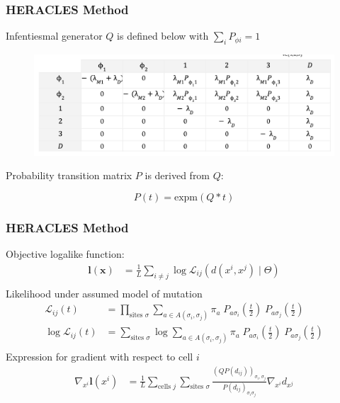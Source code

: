 \documentclass[
	11pt, %
]{beamer}
\begin{document}

\begin{frame}
	\frametitle{HERACLES Method}
	Infentiesmal generator $Q$ is defined below with $\sum_i P_{\phi i} = 1$

	\begin{figure}
		\includegraphics[width=0.95 \linewidth]{rate-matrix-q.png}
	\end{figure}

	Probability transition matrix $P$ is derived from $Q$:

	\begin{equation*}
		P(t) = \textrm{expm}(Q * t)
	\end{equation*}
\end{frame}


\begin{frame}
	\frametitle{HERACLES Method}
	Objective logalike function:
	\begin{align*}
		\mathbf{l}(\mathbf{x} )&= \frac{1}{L} \sum_{i \neq j} \log \mathcal{L}_{ij}(d(x^i, x^j) \mid \Theta) \\
	\end{align*}
	Likelihood under assumed model of mutation
	\begin{align*}
		\mathcal{L}_{ij}(t) &= \prod_{\textrm{sites } \sigma} \sum_{a \in A(\sigma_i, \sigma_j)} \pi_a \; P_{a \sigma_i}(\frac{t}{2}) \; P_{a \sigma_j}(\frac{t}{2}) \\
		\log \mathcal{L}_{ij}(t) &= \sum _{\textrm{sites } \sigma} \log \sum_{a \in A(\sigma_i, \sigma_j)} \pi_a \; P_{a \sigma_i}(\frac{t}{2}) \; P_{a \sigma_j}(\frac{t}{2}) \\
	\end{align*}
	Expression for gradient with respect to cell $i$
	\begin{align*}
		\nabla_{x^i} \mathbf{l}(x^i) &= \frac{1}{L} \sum_{\textrm{cells } j} \sum_{\textrm{sites } \sigma} \frac{(QP(d_{ij}))_{\sigma_i, \sigma_j}}{P(d_{ij})_{\sigma_i \sigma_j}} \nabla_{x^i} d_{x^j}
	\end{align*}
\end{frame}
\end{document}

